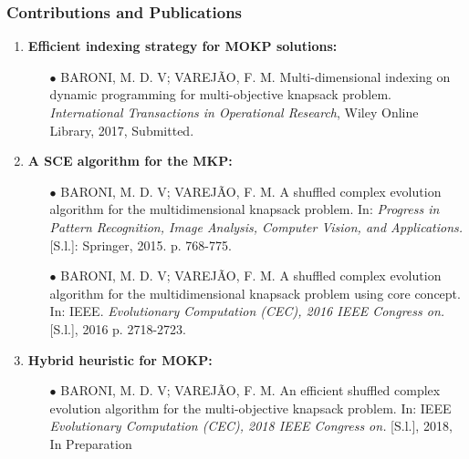 \begin{frame}
\frametitle{Contributions and Publications}\pause
\begin{enumerate}
\item{
\textbf{Efficient indexing strategy for MOKP solutions:} \pause
\begin{itemize}
 \item[{\tiny$\bullet$}] { BARONI, M. D. V; VAREJ\~AO, F. M. Multi-dimensional indexing on dynamic programming for multi-objective knapsack problem. \textit{International Transactions in Operational Research}, Wiley Online Library, 2017, Submitted. }
\end{itemize}
} \pause
\medskip
\item{
\textbf{A SCE algorithm for the MKP:} \pause
\begin{itemize}
  \item[{\tiny$\bullet$}] { BARONI, M. D. V; VAREJ\~AO, F. M. A shuffled complex evolution algorithm
  for the multidimensional knapsack problem. In: \textit{Progress in Pattern Recognition, Image Analysis, Computer Vision, and Applications.} [S.l.]: Springer, 2015. p. 768-775. }
  \pause
 \item[{\tiny$\bullet$}] { BARONI, M. D. V; VAREJ\~AO, F. M. A shuffled complex evolution algorithm
  for the multidimensional knapsack problem using core concept. In: IEEE. \textit{Evolutionary Computation (CEC), 2016 IEEE Congress on.} [S.l.], 2016 p. 2718-2723. }
\end{itemize}
} \pause
\medskip
\item{
\textbf{Hybrid heuristic for MOKP:} \pause
\begin{itemize}
 \item[{\tiny$\bullet$}] { BARONI, M. D. V; VAREJ\~AO, F. M. An efficient shuffled complex evolution algorithm for the multi-objective knapsack problem. In: IEEE \textit{Evolutionary Computation (CEC), 2018 IEEE Congress on.} [S.l.], 2018, In Preparation }
\end{itemize}
}
\end{enumerate}
\end{frame}
